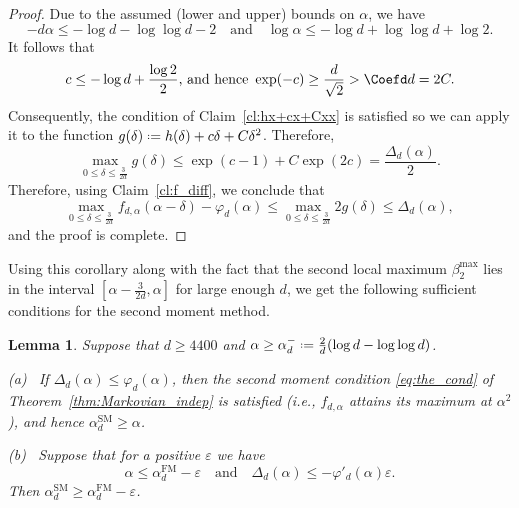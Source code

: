 \documentclass[12pt]{amsart}
\newtheorem{lemma}[theorem]{Lemma}
\theoremstyle{definition}
\newcommand\al{\alpha}
\newcommand\be{\beta}
\newcommand\de{\delta}
\newcommand\De{\Delta}
\newcommand\eps{\varepsilon}
\newcommand\ka{\kappa}
\newcommand\alfm{\alpha^{\mathrm{FM}}}
\newcommand\alsm{\alpha^{\mathrm{SM}}}
\newcommand{\defeq}{\mathrel{\vcenter{\baselineskip0.5ex \lineskiplimit0pt
                     \hbox{\scriptsize.}\hbox{\scriptsize.}}}%
                     =}
\begin{document}
%
\begin{proof}
Due to the assumed (lower and upper) bounds on $\al$, we have 
%
\[ -d\al \leq -\log d - \log\log d - 2 
\quad \text{and} \quad 
\log \al \leq -\log d + \log\log d + \log 2 .\]
%
It follows that 
\[ c \leq -\log d + \frac{\log 2}{2} 
\text{, and hence } 
\exp(-c) \geq \frac{d}{\sqrt{2}} > \Coefd d = 2C .\]
%
Consequently, the condition of Claim~\ref{cl:hx+cx+Cxx} is satisfied so we can apply it to the function $g(\de) \defeq h(\de)+c\de + C \de^2$.
%
Therefore, 
%
\[ \max_{0 \leq \de \leq \frac{3}{2d}} g(\de) 
\leq \exp(c-1)+C\exp(2c) 
= \frac{\De_d(\al)}{2} .\]
%
Therefore, using Claim~\ref{cl:f_diff}, we conclude that  
%
\[ \max_{0 \leq \de \leq \frac{3}{2d}} 
f_{d,\al}(\al-\de) - \varphi_d(\al) \leq 
\max_{0 \leq \de \leq \frac{3}{2d}} 2g(\de) 
\leq \De_d(\al) ,\]
%
and the proof is complete.
\end{proof}
%
Using this corollary along with the fact that the second local maximum $\be_2^{\max}$ lies in the interval $[\al-\frac{3}{2d},\al]$ for large enough $d$, we get the following sufficient conditions for the second moment method.
%
\begin{lemma} \label{lem:sm_conds}
Suppose that 
$d \geq 4400$ and $\al \geq \al_d^- \defeq \frac{2}{d} (\log d-\log\log d)$.

\medskip

\noindent (a) \, If $\De_{d}(\al) \leq \varphi_d(\al)$, then the second moment condition \eqref{eq:the_cond} of Theorem~\ref{thm:Markovian_indep} is satisfied (i.e., $f_{d,\al}$ attains its maximum at $\al^2$), and hence $\alsm_d \geq \al$. 

\medskip

\noindent (b) \,  Suppose that for a positive $\eps$ we have 
\[ \al \leq \alfm_d - \eps 
\quad \text{and} \quad 
\De_{d}(\al) \leq -\varphi'_d(\al) \eps. \]
%
Then $\alsm_d \geq \alfm_d - \eps$.
\end{lemma}
%
\end{document}

